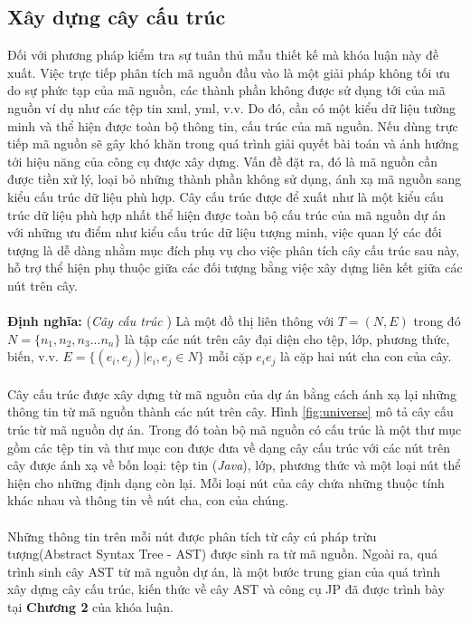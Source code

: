 \documentclass[12pt]{report}
\begin{document}
\subsection{Xây dựng cây cấu trúc}
Đối với phương pháp kiểm tra sự tuân thủ mẫu thiết kế mà khóa luận này đề xuất. Việc trực tiếp phân tích mã nguồn đầu vào là một giải pháp không tối ưu do sự phức tạp của mã nguồn, các thành phần không được sử dụng tới của mã nguồn ví dụ như các tệp tin xml, yml, v.v. Do đó, cần có một kiểu dữ liệu tường minh và thể hiện được toàn bộ thông tin, cấu trúc của mã nguồn. Nếu dùng trực tiếp mã nguồn sẽ gây khó khăn trong quá trình giải quyết bài toán và ảnh hưởng tới hiệu năng của công cụ được xây dựng. Vấn đề đặt ra, đó là mã nguồn cần được tiền xử lý, loại bỏ những thành phần không sử dụng, ánh xạ mã nguồn sang kiểu cấu trúc dữ liệu phù hợp. Cây cấu trúc được để xuất như là một kiểu cấu trúc dữ liệu phù hợp nhất thể hiện được toàn bộ cấu trúc của mã nguồn dự án với những ưu điểm như kiểu cấu trúc dữ liệu tượng minh, việc quan lý các đối tượng là dễ dàng nhằm mục đích phụ vụ cho việc phân tích cây cấu trúc sau này, hỗ trợ thể hiện phụ thuộc giữa các đối tượng bằng việc xây dựng liên kết giữa các nút trên cây.
\\
\\
\textbf{Định nghĩa: }(\textit{Cây cấu trúc} \cite{jcia}) Là một đồ thị liên thông với $T = (N,E)$ trong đó $N = \{n_1,n_2,n_3...n_n \}$ là tập các nút trên cây đại diện cho tệp, lớp, phương thức, biến, v.v. $E = \{(e_i,e_j) | e_i, e_j \in N \}$ mỗi cặp $e_ie_j$ là cặp hai nút cha con của cây.\\\\
Cây cấu trúc được xây dựng từ mã nguồn của dự án bằng cách ánh xạ lại những thông tin từ mã nguồn thành các nút trên cây. Hình \ref{fig:universe} mô tả cây cấu trúc từ mã nguồn dự án. Trong đó toàn bộ mã nguồn có cấu trúc là một thư mục gồm các tệp tin và thư mục con được đưa về dạng cây cấu trúc với các nút trên cây được ánh xạ về bốn loại: tệp tin (\textit{Java}), lớp, phương thức và một loại nút thể hiện cho những định dạng còn lại. Mỗi loại nút của cây chứa những thuộc tính khác nhau và thông tin về nút cha, con của chúng.
\\\\Những thông tin trên mỗi nút được phân tích từ cây cú pháp trừu tượng(Abstract Syntax Tree - AST) được sinh ra từ mã nguồn. Ngoài ra, quá trình sinh cây AST từ mã nguồn dự án, là một bước trung gian của quá trình xây dựng cây cấu trúc, kiến thức về cây AST và công cụ JP đã được trình bày tại \textbf{Chương 2} của khóa luận.
\end{document}
